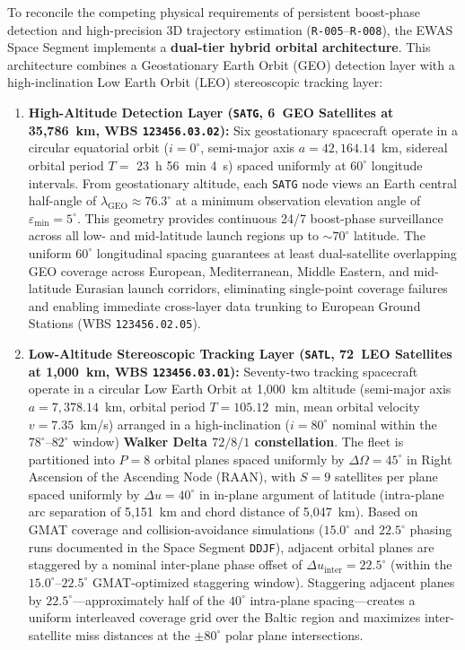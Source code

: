 \documentclass[11pt,a4paper]{article}
\providecommand{\abbr}[1]{#1}
\begin{document}
To reconcile the competing physical requirements of persistent boost-phase detection and high-precision 3D trajectory estimation (\texttt{R-005}--\texttt{R-008}), the \abbr{EWAS} Space Segment implements a \textbf{dual-tier hybrid orbital architecture}. This architecture combines a Geostationary Earth Orbit (\abbr{GEO}) detection layer with a high-inclination Low Earth Orbit (\abbr{LEO}) stereoscopic tracking layer:
\begin{enumerate}
    \item \textbf{High-Altitude Detection Layer (\texttt{SATG}, 6~\abbr{GEO} Satellites at 35,786~km, \abbr{WBS} \texttt{123456.03.02}):} Six geostationary spacecraft operate in a circular equatorial orbit ($i = 0^\circ$, semi-major axis $a = 42{,}164.14$~km, sidereal orbital period $T =$ 23~h 56~min 4~s) spaced uniformly at $60^\circ$ longitude intervals. From geostationary altitude, each \texttt{SATG} node views an Earth central half-angle of $\lambda_{\text{GEO}} \approx 76.3^\circ$ at a minimum observation elevation angle of $\varepsilon_{\min} = 5^\circ$. This geometry provides continuous 24/7 boost-phase surveillance across all low- and mid-latitude launch regions up to $\sim 70^\circ$ latitude. The uniform $60^\circ$ longitudinal spacing guarantees at least dual-satellite overlapping \abbr{GEO} coverage across European, Mediterranean, Middle Eastern, and mid-latitude Eurasian launch corridors, eliminating single-point coverage failures and enabling immediate cross-layer data trunking to European Ground Stations (\abbr{WBS} \texttt{123456.02.05}).
    \item \textbf{Low-Altitude Stereoscopic Tracking Layer (\texttt{SATL}, 72~\abbr{LEO} Satellites at 1,000~km, \abbr{WBS} \texttt{123456.03.01}):} Seventy-two tracking spacecraft operate in a circular Low Earth Orbit at 1,000~km altitude (semi-major axis $a = 7{,}378.14$~km, orbital period $T = 105.12$~min, mean orbital velocity $v = 7.35$~km/s) arranged in a high-inclination ($i = 80^\circ$ nominal within the $78^\circ\text{--}82^\circ$ window) \textbf{Walker Delta $72/8/1$ constellation}. The fleet is partitioned into $P = 8$ orbital planes spaced uniformly by $\Delta\Omega = 45^\circ$ in Right Ascension of the Ascending Node (RAAN), with $S = 9$ satellites per plane spaced uniformly by $\Delta u = 40^\circ$ in in-plane argument of latitude (intra-plane arc separation of 5,151~km and chord distance of 5,047~km). Based on GMAT coverage and collision-avoidance simulations ($15.0^\circ$ and $22.5^\circ$ phasing runs documented in the Space Segment \texttt{DDJF}), adjacent orbital planes are staggered by a nominal inter-plane phase offset of \textbf{$\Delta u_{\text{inter}} = 22.5^\circ$} (within the $15.0^\circ\text{--}22.5^\circ$ GMAT-optimized staggering window). Staggering adjacent planes by $22.5^\circ$---approximately half of the $40^\circ$ intra-plane spacing---creates a uniform interleaved coverage grid over the Baltic region and maximizes inter-satellite miss distances at the $\pm 80^\circ$ polar plane intersections.
\end{enumerate}
\end{document}
